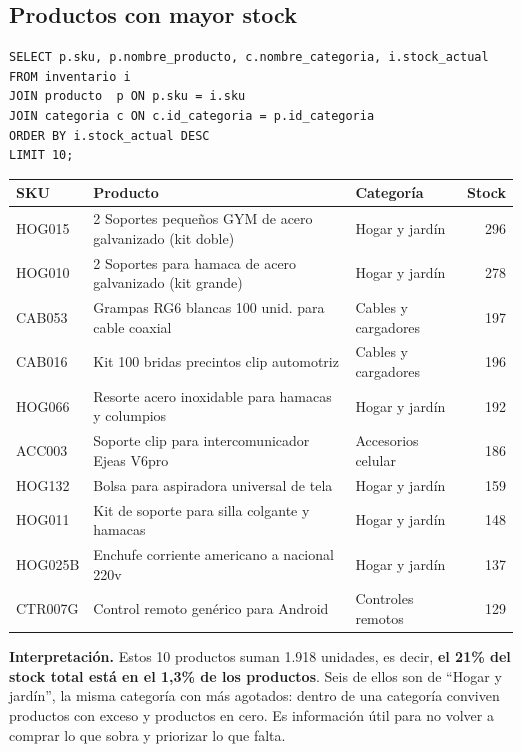 \documentclass[11pt,letterpaper]{article}
\renewcommand{\_}{\oldus\allowbreak}
\begin{document}
\subsection{Productos con mayor stock}
\begin{lstlisting}[caption={Consulta 4: top 10 productos con mayor stock.}]
SELECT p.sku, p.nombre_producto, c.nombre_categoria, i.stock_actual
FROM inventario i
JOIN producto  p ON p.sku = i.sku
JOIN categoria c ON c.id_categoria = p.id_categoria
ORDER BY i.stock_actual DESC
LIMIT 10;
\end{lstlisting}

\begin{center}
\small
\begin{minipage}{\textwidth}\centering
{}
\begin{tabularx}{\textwidth}{l X l r}
\toprule
\textbf{SKU} & \textbf{Producto} & \textbf{Categoría} & \textbf{Stock} \\
\midrule
HOG015 & 2 Soportes pequeños GYM de acero galvanizado (kit doble) & Hogar y jardín & 296 \\
HOG010 & 2 Soportes para hamaca de acero galvanizado (kit grande) & Hogar y jardín & 278 \\
CAB053 & Grampas RG6 blancas 100 unid. para cable coaxial & Cables y cargadores & 197 \\
CAB016 & Kit 100 bridas precintos clip automotriz & Cables y cargadores & 196 \\
HOG066 & Resorte acero inoxidable para hamacas y columpios & Hogar y jardín & 192 \\
ACC003 & Soporte clip para intercomunicador Ejeas V6pro & Accesorios celular & 186 \\
HOG132 & Bolsa para aspiradora universal de tela & Hogar y jardín & 159 \\
HOG011 & Kit de soporte para silla colgante y hamacas & Hogar y jardín & 148 \\
HOG025B & Enchufe corriente americano a nacional 220v & Hogar y jardín & 137 \\
CTR007G & Control remoto genérico para Android & Controles remotos & 129 \\
\bottomrule
\end{tabularx}
\end{minipage}
\end{center}

\textbf{Interpretación.} Estos 10 productos suman 1.918 unidades, es decir, \textbf{el 21\% del stock total está en el 1,3\% de los productos}. Seis de ellos son de “Hogar y jardín”, la misma categoría con más agotados: dentro de una categoría conviven productos con exceso y productos en cero. Es información útil para no volver a comprar lo que sobra y priorizar lo que falta.
\end{document}
